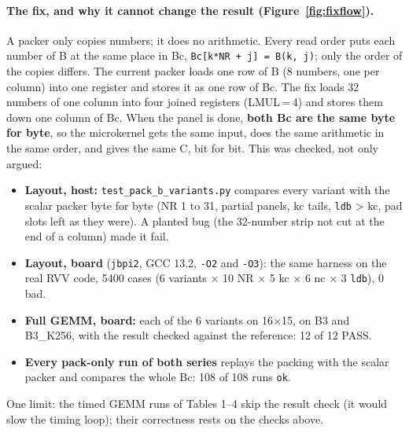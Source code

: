 \documentclass[10pt,a4paper]{article}
\newcommand{\key}[1]{\textbf{\textcolor{blue!55!black}{#1}}}  %
\begin{document}
\paragraph{The fix, and why it cannot change the result (Figure~\ref{fig:fixflow}).} A packer only copies numbers; it does no
arithmetic. Every read order puts each number of B at the same place in Bc, \texttt{Bc[k*NR + j] = B(k, j)}; only the order of the
copies differs. The current packer loads one row of B (8 numbers, one per column) into one register and stores it as one row of Bc.
The fix loads 32 numbers of one column into four joined registers (LMUL\,=\,4) and stores them down one column of Bc. When the panel is
done, \key{both Bc are the same byte for byte}, so the microkernel gets the same input, does the same arithmetic in the same order, and
gives the same C, bit for bit. This was checked, not only argued:
\begin{itemize}
  \item \textbf{Layout, host:} \texttt{test\_pack\_b\_variants.py} compares every variant with the scalar packer byte for byte (NR 1 to 31,
  partial panels, kc tails, \texttt{ldb} > kc, pad slots left as they were). A planted bug (the 32-number strip not cut at the end of a
  column) made it fail.
  \item \textbf{Layout, board} (\texttt{jbpi2}, GCC 13.2, \texttt{-O2} and \texttt{-O3}): the same harness on the real RVV code,
  5400 cases (6 variants $\times$ 10 NR $\times$ 5 kc $\times$ 6 nc $\times$ 3 \texttt{ldb}), 0 bad.
  \item \textbf{Full GEMM, board:} each of the 6 variants on 16$\times$15, on B3 and B3\_K256, with the result checked against the
  reference: 12 of 12 PASS.
  \item \textbf{Every pack-only run of both series} replays the packing with the scalar packer and compares the whole Bc: 108 of 108
  runs \texttt{ok}.
\end{itemize}
One limit: the timed GEMM runs of Tables 1--4 skip the result check (it would slow the timing loop); their correctness rests on the
checks above.
\end{document}
